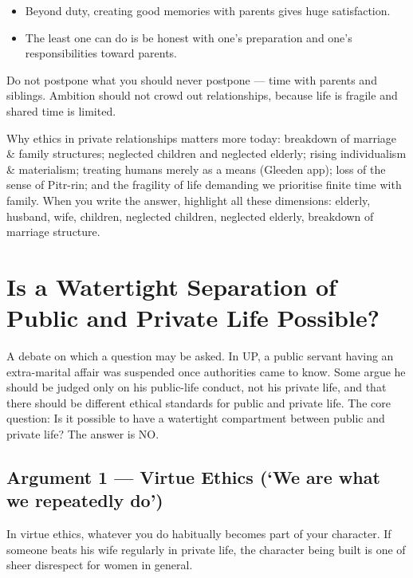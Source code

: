 \begin{itemize}
\item Beyond duty, creating good memories with parents gives huge satisfaction.
\item The least one can do is be honest with one's preparation and one's responsibilities toward parents.
\end{itemize}

\begin{CriticalPoint}
Do not postpone what you should never postpone --- time with parents and siblings. Ambition should not crowd out relationships, because life is fragile and shared time is limited.
\end{CriticalPoint}

\begin{QuickRevision}
Why ethics in private relationships matters more today: breakdown of marriage \& family structures; neglected children and neglected elderly; rising individualism \& materialism; treating humans merely as a means (Gleeden app); loss of the sense of Pitr-rin; and the fragility of life demanding we prioritise finite time with family. When you write the answer, highlight all these dimensions: elderly, husband, wife, children, neglected children, neglected elderly, breakdown of marriage structure.
\end{QuickRevision}

\section{Is a Watertight Separation of Public and Private Life Possible?}

A debate on which a question may be asked. In UP, a public servant having an extra-marital affair was suspended once authorities came to know. Some argue he should be judged only on his public-life conduct, not his private life, and that there should be different ethical standards for public and private life. The core question: Is it possible to have a watertight compartment between public and private life? The answer is NO.

\subsection{Argument 1 --- Virtue Ethics (`We are what we repeatedly do')}

In virtue ethics, whatever you do habitually becomes part of your character. If someone beats his wife regularly in private life, the character being built is one of sheer disrespect for women in general.

